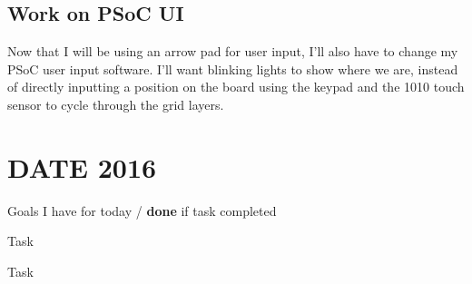 \documentclass[12pt,twoside]{article}
\newenvironment{tight_itemize}{
\begin{itemize}
  \setlength{\itemsep}{0pt}
  \setlength{\parskip}{0pt}
}{\end{itemize}}
\begin{document}
\subsection{Work on PSoC UI}
Now that I will be using an arrow pad for user input, I'll also have to change my PSoC user input software. I'll want blinking lights to show where we are, instead of directly inputting a position on the board using the keypad and the 1010 touch sensor to cycle through the grid layers. 


\newpage
\section{DATE 2016}

Goals I have for today / {\bf done} if task completed
\begin{tight_itemize}
\item Task %
\item Task 
\end{tight_itemize}
\end{document}
